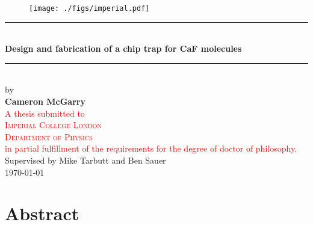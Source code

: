 \documentclass[a4paper, 12pt, twoside]{report}
\newcommand{\thesis}[1]{\textcolor{red}{#1}} %
\newcommand{\CaF}{CaF}
\begin{document}

\begin{titlepage}

  \begin{figure}
    \texttt{[image: ./figs/imperial.pdf]}
  \end{figure}

  \begin{center}
    \vspace*{1cm}
    \rule{\linewidth}{0.5mm} \\[0.4cm]
    {\huge \bfseries Design and fabrication of a chip trap for \CaF{} molecules}\\
    \rule{\linewidth}{0.5mm} \\[1.0cm]
    by \\[0.5cm]
    {\Large \textbf{Cameron McGarry}} \\[0.5cm]
    \thesis{
    A thesis submitted to \\[0.5cm]
    \textsc{\Large Imperial College London}\\[0.5cm] 
    \textsc{\large Department of Physics}\\[0.5cm] 
    in partial fulfillment of the requirements for the degree of doctor of
    philosophy. \\[0.5cm]
  }
    Supervised by Mike Tarbutt and Ben Sauer \\[0.5cm]
    \makeatletter
    \monthyeardate\today
    \makeatother

  \end{center}



\end{titlepage}

\chapter*{Abstract}

\clearpage

\tableofcontents
\clearpage

\setcounter{page}{4} 

\end{document}
